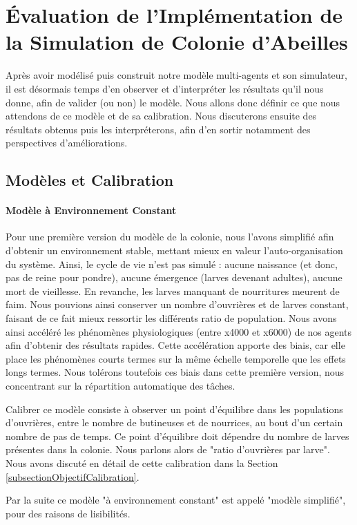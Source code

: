 \chapter{Évaluation de l'Implémentation de la Simulation de Colonie d'Abeilles}
\label{ChapitreEvalSMA}
	Après avoir modélisé puis construit notre modèle multi-agents et son simulateur, il est désormais temps d'en observer et d'interpréter les résultats qu'il nous donne, afin de valider (ou non) le modèle. Nous allons donc définir ce que nous attendons de ce modèle et de sa calibration. Nous discuterons ensuite des résultats obtenus puis les interpréterons, afin d'en sortir notamment des perspectives d'améliorations.
	
	
	\section{Modèles et Calibration}
			\subsubsection{Modèle à Environnement Constant}
			Pour une première version du modèle de la colonie, nous l'avons simplifié afin d'obtenir un environnement stable, mettant mieux en valeur l'auto-organisation du système. Ainsi, le cycle de vie n'est pas simulé : aucune naissance (et donc, pas de reine pour pondre), aucune émergence (larves devenant adultes), aucune mort de vieillesse. En revanche, les larves manquant de nourritures meurent de faim. Nous pouvions ainsi conserver un nombre d'ouvrières et de larves constant, faisant de ce fait mieux ressortir les différents ratio de population. Nous avons ainsi accéléré les phénomènes physiologiques (entre x4000 et x6000) de nos agents afin d'obtenir des résultats rapides. Cette accélération apporte des biais, car elle place les phénomènes courts termes sur la même échelle temporelle que les effets longs termes. Nous tolérons toutefois ces biais dans cette première version, nous concentrant sur la répartition automatique des tâches. 
			
			Calibrer ce modèle consiste à observer un point d'équilibre dans les populations d'ouvrières, entre le nombre de butineuses et de nourrices, au bout d'un certain nombre de pas de temps. Ce point d'équilibre doit dépendre du nombre de larves présentes dans la colonie. Nous parlons alors de "ratio d'ouvrières par larve". Nous avons discuté en détail de cette calibration dans la Section \ref{subsectionObjectifCalibration}.
			
			Par la suite ce modèle "à environnement constant" est appelé "modèle simplifié", pour des raisons de lisibilités.
			
